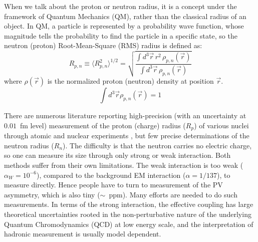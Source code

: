 When we talk about the proton or neutron radius, it is a concept under the
framework of Quantum Mechanics (QM), rather than the classical radius of an object.
In QM, a particle is represented by a probability
wave function, whose magnitude tells the probability to find the particle in a specific
state, so the neutron (proton) Root-Mean-Square (RMS) radius is defined as:
\begin{equation}
    R_{p, n} \equiv \langle R_{p,n}^2\rangle^{1/2} = \sqrt{\frac{\int d^3\vec{r}\,r^2\,\rho_{p,n}(\vec{r})}{\int d^3\vec{r}\,\rho_{p,n}(\vec{r})}}
    \label{eq:nucleon_rms_radius}
\end{equation}
where $\rho(\vec{r})$ is the normalized proton (neutron) density at position $\vec{r}$.
\begin{equation}
    \int d^3\vec{r} \rho_{p, n}(\vec{r}) = 1 
\end{equation}

There are numerous literature reporting high-precision  
(with an uncertainty at $0.01$~fm level)
measurement of the proton (charge) radius ($R_p$) of various nuclei through atomic 
and nuclear experiments \cite{DEVRIES1987495, ANGELI201369}, but few
precise determinations of the neutron radius ($R_n$). The difficulty is that
the neutron carries no electric charge, so one can measure its size through only 
strong or weak interaction. Both methods suffer from their own limitations. 
The weak interaction is too weak ($\alpha_W = 10^{-6}$), compared to the 
background EM interaction ($\alpha = 1/137$), to measure directly.
Hence people have to turn to measurement of the PV asymmetry, which is also tiny ($\sim$~ppm).
Many efforts are needed to do such measurements.
In terms of the strong interaction, the effective coupling has large theoretical uncertainties rooted 
in the non-perturbative nature of the underlying Quantum Chromodynamics (QCD) at low energy scale, 
and the interpretation of hadronic measurement is usually model dependent. 

